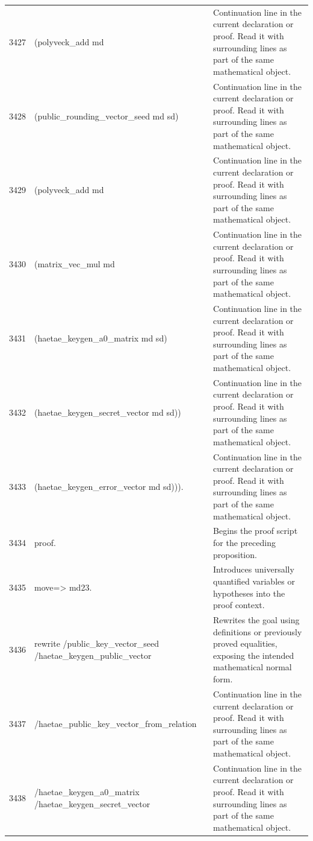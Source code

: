 \documentclass[10pt]{article}
\begin{document}
\begin{longtable}{r L{0.53\textwidth} L{0.37\textwidth}}
3427 & {\ttfamily\scriptsize     (polyveck\_add md} & Continuation line in the current declaration or proof.  Read it with surrounding lines as part of the same mathematical object. \\
3428 & {\ttfamily\scriptsize       (public\_rounding\_vector\_seed md sd)} & Continuation line in the current declaration or proof.  Read it with surrounding lines as part of the same mathematical object. \\
3429 & {\ttfamily\scriptsize       (polyveck\_add md} & Continuation line in the current declaration or proof.  Read it with surrounding lines as part of the same mathematical object. \\
3430 & {\ttfamily\scriptsize         (matrix\_vec\_mul md} & Continuation line in the current declaration or proof.  Read it with surrounding lines as part of the same mathematical object. \\
3431 & {\ttfamily\scriptsize           (haetae\_keygen\_a0\_matrix md sd)} & Continuation line in the current declaration or proof.  Read it with surrounding lines as part of the same mathematical object. \\
3432 & {\ttfamily\scriptsize           (haetae\_keygen\_secret\_vector md sd))} & Continuation line in the current declaration or proof.  Read it with surrounding lines as part of the same mathematical object. \\
3433 & {\ttfamily\scriptsize         (haetae\_keygen\_error\_vector md sd))).} & Continuation line in the current declaration or proof.  Read it with surrounding lines as part of the same mathematical object. \\
3434 & {\ttfamily\scriptsize proof.} & Begins the proof script for the preceding proposition. \\
3435 & {\ttfamily\scriptsize move=> md23.} & Introduces universally quantified variables or hypotheses into the proof context. \\
3436 & {\ttfamily\scriptsize rewrite /public\_key\_vector\_seed /haetae\_keygen\_public\_vector} & Rewrites the goal using definitions or previously proved equalities, exposing the intended mathematical normal form. \\
3437 & {\ttfamily\scriptsize         /haetae\_public\_key\_vector\_from\_relation} & Continuation line in the current declaration or proof.  Read it with surrounding lines as part of the same mathematical object. \\
3438 & {\ttfamily\scriptsize         /haetae\_keygen\_a0\_matrix /haetae\_keygen\_secret\_vector} & Continuation line in the current declaration or proof.  Read it with surrounding lines as part of the same mathematical object. \\

\end{longtable}
\end{document}
